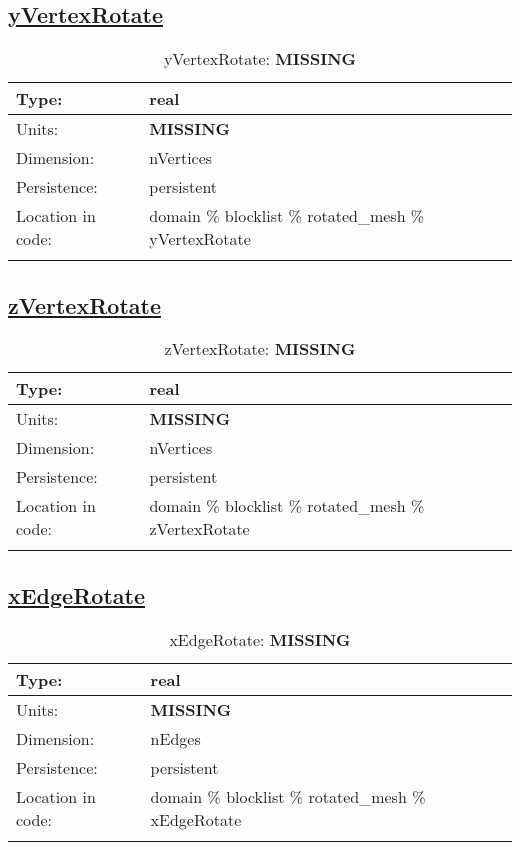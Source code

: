 \subsection[yVertexRotate]{\hyperref[sec:var_tab_rotated_mesh]{yVertexRotate}}
\label{subsec:var_sec_rotated_mesh_yVertexRotate}
\begin{center}
\begin{longtable}{| p{2.0in} | p{4.0in} |}
        \hline 
        Type: & real \\
        \hline 
        Units: & {\bf \color{red} MISSING} \\
        \hline 
        Dimension: & nVertices \\
        \hline 
        Persistence: & persistent \\
        \hline 
         Location in code: & domain \% blocklist \% rotated\_mesh \% yVertexRotate \\
         \hline 
    \caption{yVertexRotate: {\bf \color{red} MISSING}}
\end{longtable}
\end{center}
\subsection[zVertexRotate]{\hyperref[sec:var_tab_rotated_mesh]{zVertexRotate}}
\label{subsec:var_sec_rotated_mesh_zVertexRotate}
\begin{center}
\begin{longtable}{| p{2.0in} | p{4.0in} |}
        \hline 
        Type: & real \\
        \hline 
        Units: & {\bf \color{red} MISSING} \\
        \hline 
        Dimension: & nVertices \\
        \hline 
        Persistence: & persistent \\
        \hline 
         Location in code: & domain \% blocklist \% rotated\_mesh \% zVertexRotate \\
         \hline 
    \caption{zVertexRotate: {\bf \color{red} MISSING}}
\end{longtable}
\end{center}
\subsection[xEdgeRotate]{\hyperref[sec:var_tab_rotated_mesh]{xEdgeRotate}}
\label{subsec:var_sec_rotated_mesh_xEdgeRotate}
\begin{center}
\begin{longtable}{| p{2.0in} | p{4.0in} |}
        \hline 
        Type: & real \\
        \hline 
        Units: & {\bf \color{red} MISSING} \\
        \hline 
        Dimension: & nEdges \\
        \hline 
        Persistence: & persistent \\
        \hline 
         Location in code: & domain \% blocklist \% rotated\_mesh \% xEdgeRotate \\
         \hline 
    \caption{xEdgeRotate: {\bf \color{red} MISSING}}
\end{longtable}
\end{center}
